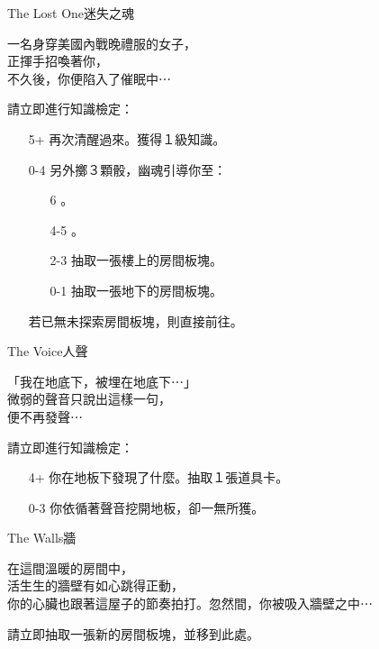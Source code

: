 %
\begin{EventCard}{The Lost One}{迷失之魂}

  \begin{CardStory}
    一名身穿美國內戰晚禮服的女子，\\
    正揮手招喚著你，\\
    不久後，你便陷入了催眠中⋯
  \end{CardStory}

  請立即進行知識檢定：
  \begin{itemize}
    \item[5+] 再次清醒過來。獲得１級知識。
    \item[0-4] 另外擲３顆骰，幽魂引導你至：
      \begin{itemize}
        \item[6] 。
        \item[4-5] 。
        \item[2-3] 抽取一張樓上的房間板塊。
        \item[0-1] 抽取一張地下的房間板塊。
      \end{itemize}
      若已無未探索房間板塊，則直接前往。
  \end{itemize}

\end{EventCard}%
%
\begin{EventCard}{The Voice}{人聲}

  \begin{CardStory}
    「我在地底下，被埋在地底下⋯」\\
    微弱的聲音只說出這樣一句，\\
    便不再發聲⋯
  \end{CardStory}

  請立即進行知識檢定：
  \begin{itemize}
    \item[4+] 你在地板下發現了什麼。抽取１張道具卡。
    \item[0-3] 你依循著聲音挖開地板，卻一無所獲。
  \end{itemize}

\end{EventCard}%
%
\begin{EventCard}{The Walls}{牆}

  \begin{CardStory}
    在這間溫暖的房間中，\\
    活生生的牆壁有如心跳得正動，\\
    你的心臟也跟著這屋子的節奏拍打。忽然間，你被吸入牆壁之中⋯
  \end{CardStory}

  請立即抽取一張新的房間板塊，並移到此處。\\[0.5em]

\end{EventCard}%
